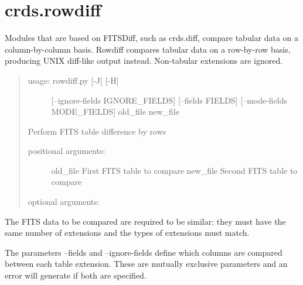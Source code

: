 \documentclass[letterpaper,10pt,english]{sphinxmanual}
\begin{document}
\section{crds.rowdiff}
\label{command_line_tools:crds-rowdiff}
Modules that are based on FITSDiff, such as crds.diff, compare
tabular data on a column-by-column basis. Rowdiff compares tabular data
on a row-by-row basis, producing UNIX diff-like output instead.
Non-tabular extensions are ignored.
\begin{quote}
\begin{description}
\item[{usage: rowdiff.py {[}-J{]} {[}-H{]}}] \leavevmode
{[}--ignore-fields IGNORE\_FIELDS{]}
{[}--fields FIELDS{]}
{[}--mode-fields MODE\_FIELDS{]} old\_file new\_file

\end{description}

Perform FITS table difference by rows
\begin{description}
\item[{positional arguments:}] \leavevmode
old\_file                First FITS table to compare
new\_file                Second FITS table to compare

\item[{optional arguments:}] \leavevmode{}

\end{description}
\end{quote}

The FITS data to be compared are required to be similar: they must have
the same number of extensions and the types of extensions must match.

The parameters --fields and --ignore-fields define which columns
are compared between each table extension. These are mutually
exclusive parameters and an error will generate if both are specified.
\end{document}
